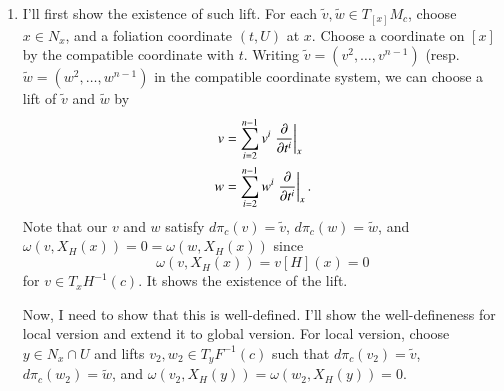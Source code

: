 \documentclass[a4paper, 12pt]{article}
\theoremstyle{Mydefinition}
\theoremstyle{Mytheorem}
\begin{document}
\begin{enumerate}
\item I'll first show the existence of such lift. For each $\tilde{v},\tilde{w}\in T_{[x]}M_c$, choose $x\in N_x$, and a foliation coordinate $(t,U)$ at $x$. Choose a coordinate on $[x]$ by the compatible coordinate with $t$. Writing $\tilde{v} = (v^2, \ldots, v^{n-1})$ (resp. $\tilde{w} = (w^2, \ldots, w^{n-1})$ in the compatible coordinate system, we can choose a lift of $\tilde{v}$ and $\tilde{w}$ by
\begin{equation*}
    \begin{split}
        v &= \sum_{i=2}^{n-1} v^i\left.\pdv{t^i}\right|_x\\
        w &= \sum_{i=2}^{n-1} w^i\left.\pdv{t^i}\right|_x.
    \end{split}
\end{equation*}
Note that our $v$ and $w$ satisfy $d\pi_c(v) = \tilde{v}$, $d\pi_c(w)=\tilde{w}$, and $\omega(v, X_H(x)) = 0 = \omega(w, X_H(x))$ since
\begin{equation*}
    \omega(v, X_H(x)) = v[H](x) = 0
\end{equation*}
for $v\in T_xH^{-1}(c)$. It shows the existence of the lift.

Now, I need to show that this is well-defined. I'll show the well-defineness for local version and extend it to global version. For local version, choose $y\in N_x\cap U$ and lifts $v_2, w_2\in T_yF^{-1}(c)$ such that $d\pi_c(v_2)=\tilde{v}$, $d\pi_c(w_2) = \tilde{w}$, and $\omega(v_2,X_H(y))=\omega(w_2,X_H(y)) = 0$.


\end{enumerate}
\end{document}
